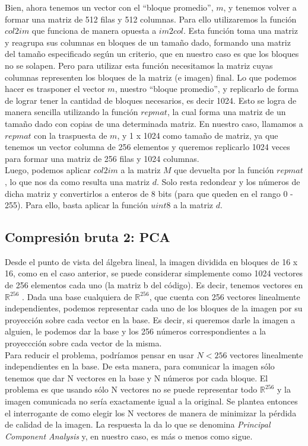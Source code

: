\documentclass[twocolumn,a4paper,10pt]{article}
\begin{document}
Bien, ahora tenemos un vector con el ``bloque promedio'', $m$, y tenemos volver a formar una matriz de 512 filas y 512 columnas. Para ello utilizaremos la funci\'on
$col2im$ que funciona de manera opuesta a $im2col$. Esta funci\'on toma una matriz y reagrupa sus columnas en bloques de un tamaño dado, formando una matriz del 
tamaño especificado seg\'un un criterio, que en nuestro caso es que los bloques no se solapen. Pero para utilizar esta funci\'on necesitamos la matriz cuyas 
columnas representen los bloques de la matriz (e imagen) final. Lo que podemos hacer es trasponer el vector $m$, nuestro ``bloque promedio'', y replicarlo de forma
de lograr tener la cantidad de bloques necesarios, es decir 1024. Esto se logra de manera sencilla utilizando la funci\'on $repmat$, la cual forma una matriz de un
tamaño dado con copias de una determinada matriz. En nuestro caso, llamamos a $repmat$ con la traspuesta de $m$, y 1 x 1024 como tamaño de matriz, ya que tenemos un 
vector columna de 256 elementos y queremos replicarlo 1024 veces para formar una matriz de 256 filas y 1024 columnas.\\

Luego, podemos aplicar $col2im$ a la matriz $M$ que devuelta por la funci\'on $repmat$, lo que nos da como resulta una matriz $d$. Solo resta redondear y los n\'umeros 
de dicha matriz y convertirlos a enteros de 8 bits (para que queden en el rango 0 - 255). Para ello, basta aplicar la funci\'on $uint8$ a la matriz $d$.

\subsection{Compresi\'on bruta 2: PCA}
\label{sec:compresion2}

Desde el punto de vista del  \'algebra lineal, la imagen dividida en bloques de 16 x 16, como en el caso anterior, se puede considerar simplemente como
1024 vectores de 256 elementos cada uno (la matriz b del código). Es decir, tenemos vectores en $\mathbb{R}^{256}$ . Dada una base cualquiera de $\mathbb{R}^{256}$,
 que cuenta con 256 vectores linealmente independientes, podemos representar cada uno de los bloques de la imagen por su proyecci\'on sobre cada vector en la base. 
Es decir, si queremos darle la imagen a alguien, le podemos dar la base y los 256 n\'umeros correspondientes a la proyeccci\'on sobre cada vector de la misma. \\

Para reducir el problema, podríamos pensar en usar $N < 256$ vectores linealmente independientes en la base. De esta manera, para comunicar la imagen s\'olo
tenemos que dar N vectores en la base y N n\'umeros por cada bloque. El problema es que usando s\'olo N vectores no se puede representar todo $\mathbb{R}^{256}$ y la 
imagen comunicada no ser\'ia exactamente igual a la original. Se plantea entonces el interrogante de como elegir los N vectores de manera de minimizar la p\'erdida 
de calidad de la imagen. La respuesta la da lo que se denomina \textit{Principal Component Analysis} y, en nuestro caso, es m\'as o menos como sigue.\\
\end{document}
